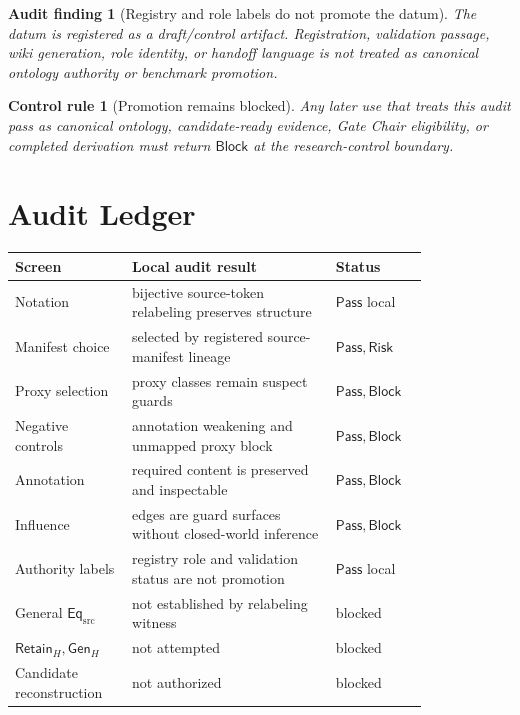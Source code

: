 \documentclass[11pt]{article}
\newcommand{\EqSrc}{\mathsf{Eq}_{\mathrm{src}}}
\newcommand{\GenH}{\mathsf{Gen}_{H}}
\newcommand{\RetainH}{\mathsf{Retain}_{H}}
\newcommand{\Pass}{\mathsf{Pass}}
\newcommand{\Block}{\mathsf{Block}}
\newcommand{\Risk}{\mathsf{Risk}}
\newtheorem{auditfinding}{Audit finding}
\newtheorem{controlrule}{Control rule}
\begin{document}
\begin{auditfinding}[Registry and role labels do not promote the datum]
The datum is registered as a draft/control artifact. Registration,
validation passage, wiki generation, role identity, or handoff language is
not treated as canonical ontology authority or benchmark promotion.
\end{auditfinding}

\begin{controlrule}[Promotion remains blocked]
Any later use that treats this audit pass as canonical ontology,
candidate-ready evidence, Gate Chair eligibility, or completed derivation
must return \(\Block\) at the research-control boundary.
\end{controlrule}

\section{Audit Ledger}

\begin{center}
\begin{tabular}{p{0.22\linewidth}p{0.42\linewidth}p{0.18\linewidth}}
\textbf{Screen} & \textbf{Local audit result} & \textbf{Status} \\
\hline
Notation & bijective source-token relabeling preserves structure & \(\Pass\) local \\
Manifest choice & selected by registered source-manifest lineage & \(\Pass,\Risk\) \\
Proxy selection & proxy classes remain suspect guards & \(\Pass,\Block\) \\
Negative controls & annotation weakening and unmapped proxy block & \(\Pass,\Block\) \\
Annotation & required content is preserved and inspectable & \(\Pass,\Block\) \\
Influence & edges are guard surfaces without closed-world inference & \(\Pass,\Block\) \\
Authority labels & registry role and validation status are not promotion & \(\Pass\) local \\
General \(\EqSrc\) & not established by relabeling witness & blocked \\
\(\RetainH,\GenH\) & not attempted & blocked \\
Candidate reconstruction & not authorized & blocked \\
\end{tabular}
\end{center}
\end{document}
